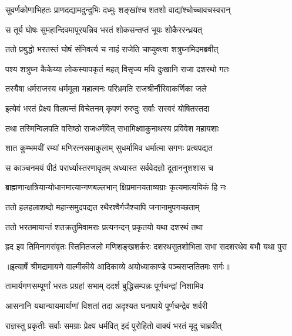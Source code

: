 \twolineshloka
{सुवर्णकोणाभिहतः प्राणदद्यामदुन्दुभिः}
{दध्मुः शङ्खांश्च शतशो वाद्यांश्चोच्चावचस्वरान्} %

\twolineshloka
{स तूर्य घोषः सुमहान्दिवमापूरयन्निव}
{भरतं शोकसन्तप्तं भूयः शोकैररन्ध्रयत्} %

\twolineshloka
{ततो प्रबुद्धो भरतस्तं घोषं संनिवर्त्य च}
{नाहं राजेति चाप्युक्त्वा शत्रुघ्नमिदमब्रवीत्} %

\twolineshloka
{पश्य शत्रुघ्न कैकेय्या लोकस्यापकृतं महत्}
{विसृज्य मयि दुःखानि राजा दशरथो गतः} %

\twolineshloka
{तस्यैषा धर्मराजस्य धर्ममूला महात्मनः}
{परिभ्रमति राजश्रीर्नौरिवाकर्णिका जले} %

\twolineshloka
{इत्येवं भरतं प्रेक्ष्य विलपन्तं विचेतनम्}
{कृपणं रुरुदुः सर्वाः सस्वरं योषितस्तदा} %

\twolineshloka
{तथा तस्मिन्विलपति वसिष्ठो राजधर्मवित्}
{सभामिक्ष्वाकुनाथस्य प्रविवेश महायशाः} %

\twolineshloka
{शात कुम्भमयीं रम्यां मणिरत्नसमाकुलाम्}
{सुधर्मामिव धर्मात्मा सगणः प्रत्यपद्यत} %

\twolineshloka
{स काञ्चनमयं पीठं परार्ध्यास्तरणावृतम्}
{अध्यास्त सर्ववेदज्ञो दूताननुशशास च} %

\twolineshloka
{ब्राह्मणान्क्षत्रियान्योधानमात्यान्गणबल्लभान्}
{क्षिप्रमानयताव्यग्राः कृत्यमात्ययिकं हि नः} %

\twolineshloka
{ततो हलहलाशब्दो महान्समुदपद्यत}
{रथैरश्वैर्गजैश्चापि जनानामुपगच्छताम्} %

\twolineshloka
{ततो भरतमायान्तं शतक्रतुमिवामराः}
{प्रत्यनन्दन् प्रकृतयो यथा दशरथं तथा} %

\fourlineindentedshloka
{ह्रद इव तिमिनागसंवृतः}
{स्तिमितजलो मणिशङ्खशर्करः}
{दशरथसुतशोभिता सभा}
{सदशरथेव बभौ यथा पुरा} %


{॥इत्यार्षे श्रीमद्रामायणे वाल्मीकीये आदिकाव्ये अयोध्याकाण्डे पञ्चसप्ततितमः सर्गः॥}


\twolineshloka
{तामार्यगणसम्पूर्णां भरतः प्रग्रहां सभाम्}
{ददर्श बुद्धिसम्पन्नः पूर्णचन्द्रां निशामिव} %

\twolineshloka
{आसनानि यथान्यायमार्याणां विशतां तदा}
{अदृश्यत घनापाये पूर्णचन्द्रेव शर्वरी} %

\twolineshloka
{राज्ञस्तु प्रकृतीः सर्वाः समग्राः प्रेक्ष्य धर्मवित्}
{इदं पुरोहितो वाक्यं भरतं मृदु चाब्रवीत्} %


